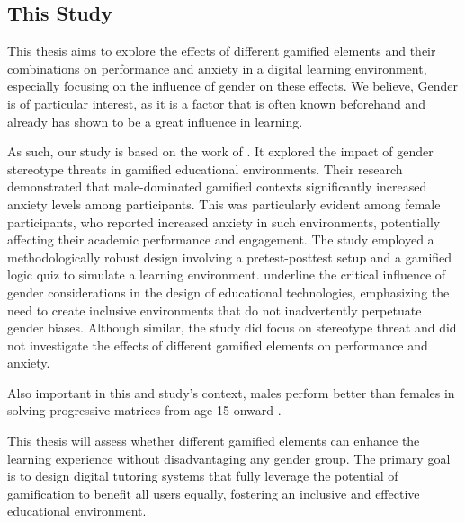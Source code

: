 \subsection{This Study}
This thesis aims to explore the effects of different gamified elements and their combinations on performance and anxiety in a digital learning environment, especially focusing on the influence of gender on these effects.
We believe, Gender is of particular interest, as it is a factor that is often known beforehand and already has shown to be a great influence in learning.

As such, our study is based on the work of \textcite{albuquerqueDoesGenderStereotype2017}.
It explored the impact of gender stereotype threats in gamified educational environments.
Their research demonstrated that male-dominated gamified contexts significantly increased anxiety levels among participants.
This was particularly evident among female participants, who reported increased anxiety in such environments, potentially affecting their academic performance and engagement.
The study employed a methodologically robust design involving a pretest-posttest setup and a gamified logic quiz to simulate a learning environment.
\textcite{albuquerqueDoesGenderStereotype2017} underline the critical influence of gender considerations in the design of educational technologies, emphasizing the need to create inclusive environments that do not inadvertently perpetuate gender biases. 
Although similar, the study did focus on stereotype threat and did not investigate the effects of different gamified elements on performance and anxiety.


Also important in this and \textcite{albuquerqueDoesGenderStereotype2017} study's context, males perform better than females in solving progressive matrices from age 15 onward \parencite{lynnSexDifferencesProgressive2004}.

This thesis will assess whether different gamified elements can enhance the learning experience without disadvantaging any gender group.
The primary goal is to design digital tutoring systems that fully leverage the potential of gamification to benefit all users equally, fostering an inclusive and effective educational environment.
